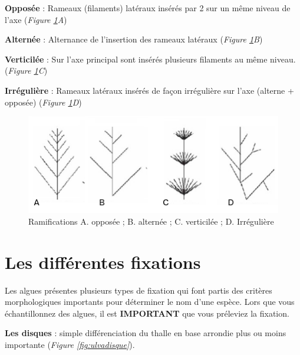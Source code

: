 \documentclass[
]{book}
\begin{document}
\textbf{Opposée} : Rameaux (filaments) latéraux insérés par 2 sur un même niveau de l'axe (\emph{Figure \ref{fig:ramif}A})

\textbf{Alternée} : Alternance de l'insertion des rameaux latéraux (\emph{Figure \ref{fig:ramif}B})

\textbf{Verticilée} : Sur l'axe principal sont insérés plusieurs filaments au même niveau. (\emph{Figure \ref{fig:ramif}C})

\textbf{Irrégulière} : Rameaux latéraux insérés de façon irrégulière sur l'axe (alterne + opposée) (\emph{Figure \ref{fig:ramif}D})

\begin{figure}[H]

{\centering \includegraphics[width=0.7\linewidth]{./images/ramifications} 

}

\caption{Ramifications A. opposée ; B. alternée ; C. verticilée ; D. Irrégulière}\label{fig:ramif}
\end{figure}

\hypertarget{les-diffuxe9rentes-fixations}{%
\section{Les différentes fixations}\label{les-diffuxe9rentes-fixations}}

Les algues présentes plusieurs types de fixation qui font partis des critères morphologiques importants pour déterminer le nom d'une espèce. Lors que vous échantillonnez des algues, il est \textbf{IMPORTANT} que vous préleviez la fixation.

\textbf{Les disques} : simple différenciation du thalle en base arrondie plus ou moins importante (\emph{Figure \ref{fig:ulvadisque}}).
\end{document}
